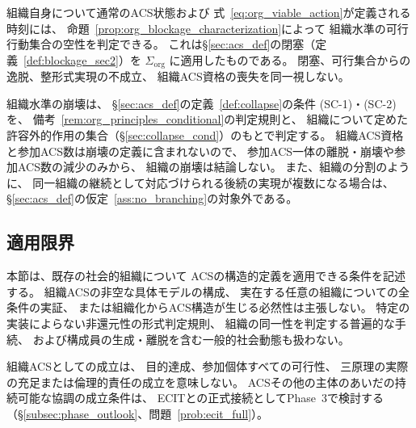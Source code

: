 \begin{remark}[閉塞・崩壊の適用域]
\label{rem:org_failure_scope}
組織自身について通常のACS状態および
式~\eqref{eq:org_viable_action}が定義される時刻には、
命題~\ref{prop:org_blockage_characterization}によって
組織水準の可行行動集合の空性を判定できる。
これは\S\ref{sec:acs_def}の閉塞（定義~\ref{def:blockage_sec2}）を
$\Sigma_{\mathrm{org}}$ に適用したものである。
閉塞、可行集合からの逸脱、整形式実現の不成立、
組織ACS資格の喪失を同一視しない。

組織水準の崩壊は、
\S\ref{sec:acs_def}の定義~\ref{def:collapse}の条件 (SC-1)・(SC-2) を、
備考~\ref{rem:org_principles_conditional}の判定規則と、
組織について定めた許容外的作用の集合（\S\ref{sec:collapse_cond}）のもとで判定する。
組織ACS資格と参加ACS数は崩壊の定義に含まれないので、
参加ACS一体の離脱・崩壊や参加ACS数の減少のみから、
組織の崩壊は結論しない。
また、組織の分割のように、
同一組織の継続として対応づけられる後続の実現が複数になる場合は、
\S\ref{sec:acs_def}の仮定~\ref{ass:no_branching}の対象外である。
\end{remark}

\subsection{適用限界}
\label{subsec:org_scope}

本節は、既存の社会的組織について
ACSの構造的定義を適用できる条件を記述する。
組織ACSの非空な具体モデルの構成、
実在する任意の組織についての全条件の実証、
または組織化からACS構造が生じる必然性は主張しない。
特定の実装によらない非還元性の形式判定規則、
組織の同一性を判定する普遍的な手続、
および構成員の生成・離脱を含む一般的社会動態も扱わない。

組織ACSとしての成立は、
目的達成、参加個体すべての可行性、
三原理の実際の充足または倫理的責任の成立を意味しない。
ACSその他の主体のあいだの持続可能な協調の成立条件は、
ECITとの正式接続としてPhase~3で検討する（\S\ref{subsec:phase_outlook}、問題~\ref{prob:ecit_full}）。
